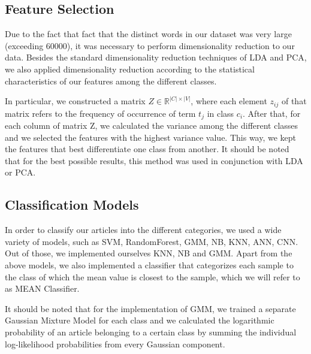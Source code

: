 \documentclass[10pt,journal,compsoc]{IEEEtran}
\begin{document}
\subsection{Feature Selection}
Due to the fact that fact that the distinct
words in our dataset was very large (exceeding 60000),
it was necessary to perform dimensionality reduction 
to our data.
Besides the standard dimensionality reduction techniques
of LDA and PCA, we also applied dimensionality reduction
according to the statistical characteristics of 
our features among the different classes.

In particular, we constructed a matrix $Z\in 
\mathbb{R}^{|C|\times |V|}$, where each element
$z_{ij}$ of that matrix refers to the frequency
of occurrence of term $t_j$ in class $c_i$.
After that, for each column of matrix Z, we 
calculated the variance among the different 
classes and we selected the features with 
the highest variance value.
This way, we kept the features that best
differentiate one class from another.
It should be noted that for the best possible
results, this method was used in conjunction with
LDA or PCA.

\subsection{Classification Models}
In order to classify our articles into the different
categories, we used a wide variety of models,
such as SVM, RandomForest, GMM, NB, KNN, ANN, CNN.
Out of those, we implemented ourselves KNN, NB 
and GMM.
Apart from the above models, we also implemented
a classifier that categorizes each sample to the
class of which the mean value is closest to the
sample, which we will refer to as MEAN Classifier.

It should be noted that for the implementation of
GMM, we trained a separate Gaussian Mixture Model
for each class and we calculated the logarithmic
probability of an article belonging to a certain 
class by summing the individual log-likelihood
probabilities from every Gaussian component.
\end{document}
